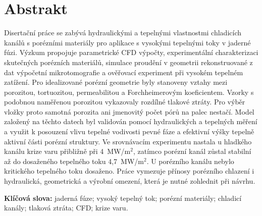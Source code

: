 \documentclass[a4paper]{article}
\begin{document}
\section*{Abstrakt}
Disertační práce se zabývá hydraulickými a tepelnými vlastnostmi chladicích kanálů s porézními materiály pro aplikace s vysokými tepelnými toky v jaderné fúzi. Výzkum propojuje parametrické CFD výpočty, experimentální charakterizaci skutečných porézních materiálů, simulace proudění v geometrii rekonstruované z dat výpočetní mikrotomografie a ověřovací experiment při vysokém tepelném zatížení. Pro idealizované porézní geometrie byly stanoveny vztahy mezi porozitou, tortuozitou, permeabilitou a Forchheimerovým koeficientem. Vzorky s podobnou naměřenou porozitou vykazovaly rozdílné tlakové ztráty. Pro výběr vložky proto samotná porozita ani jmenovitý počet pórů na palec nestačí. Model založený na těchto datech byl validován pomocí hydraulických a tepelných měření a využit k posouzení vlivu tepelné vodivosti pevné fáze a efektivní výšky tepelně aktivní části porézní struktury. Ve srovnávacím experimentu nastala u hladkého kanálu krize varu přibližně při 4~MW/m$^2$, zatímco porézní kanál zůstal stabilní až do dosaženého tepelného toku 4,7~MW/m$^2$. U porézního kanálu nebylo kritického tepelného toku dosaženo. Práce vymezuje přínosy porézního chlazení i hydraulická, geometrická a výrobní omezení, která je nutné zohlednit při návrhu.

\noindent\textbf{Klíčová slova:} jaderná fúze; vysoký tepelný tok; porézní materiály; chladicí kanály; tlaková ztráta; CFD; krize varu.

\pagebreak
\setcounter{tocdepth}{2}
\tableofcontents
\pagebreak
\end{document}
